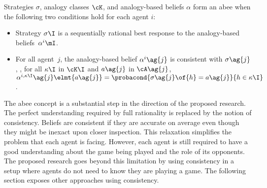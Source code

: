 Strategies \(\sigma\), analogy classes \(\cK\), and analogy-based beliefs \(\alpha\) form an \ac{abee} when the following two conditions hold for each agent \(i\):
\begin{itemize}
\item Strategy \(\sigma\I\) is a sequentially rational best response to the analogy-based beliefs~\(\alpha\belief{i}\mI\).
\item For all agent~\(j\), the analogy-based belief \(\alpha\belief{i}\ag{j}\) is consistent with \(\sigma\ag{j}\), \ie, for all \(\kappa\I\) in \(\cK\I\) and \(a\ag{j}\) in \(\cA\ag{j}\), \(\alpha\belief{i, \kappa\I}\ag{j}\elmt{a\ag{j}} = \probacond{\sigma\ag{j} \of{h} = a\ag{j}}{h \in \kappa\I}\).
\end{itemize}

The \ac{abee} concept is a substantial step in the direction of the proposed research.
The perfect understanding required by full rationality is replaced by the notion of consistency.
Beliefs are consistent if they are accurate on average even though they might be inexact upon closer inspection.
This relaxation simplifies the problem that each agent is facing.
However, each agent is still required to have a good understanding about the game being played and the role of its opponents.
The proposed research goes beyond this limitation by using consistency in a setup where agents do not need to know they are playing a game.
The following section exposes other approaches using consistency.
